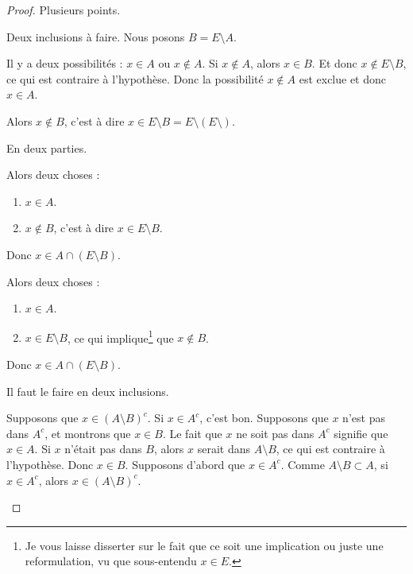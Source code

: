 \begin{proof}
	Plusieurs points.
	\begin{subproof}
		Deux inclusions à faire. Nous posons \( B=E\setminus A\).
		\begin{subproof}
			Il y a deux possibilités : \( x\in A\) ou \( x\not\in A\). Si \( x\not\in A\), alors \( x\in B\). Et donc \( x\not\in E\setminus B\), ce qui est contraire à l'hypothèse. Donc la possibilité \( x\not\in A\) est exclue et donc \( x\in A\).

			\spitem[Si \( x\in A\)]
			Alors \( x\not\in B\), c'est à dire \( x\in E\setminus B=E\setminus(E\setminus )\).
		\end{subproof}
		En deux parties.
		\begin{subproof}
			\spitem[Si \( x\in A\setminus B\)]
			Alors deux choses :
			\begin{enumerate}
				\item
				      \( x\in A\).
				\item
				      \( x\not\in B\), c'est à dire \( x\in E\setminus B\).
			\end{enumerate}
			Donc \( x\in A\cap(E\setminus B)\).

			\spitem[Si \( x\in A\cap(E\setminus B)\)]
			Alors deux choses :
			\begin{enumerate}
				\item
				      \( x\in A\).
				\item
				      \( x\in E\setminus B\), ce qui implique\footnote{Je vous laisse disserter sur le fait que ce soit une implication ou juste une reformulation, vu que sous-entendu \( x\in E\).} que \( x\not\in B\).
			\end{enumerate}
			Donc \( x\in A\cap (E\setminus B)\).
		\end{subproof}
		Il faut le faire en deux inclusions.
		\begin{subproof}
			Supposons que \( x\in(A\setminus B)^c\). Si \( x\in A^c\), c'est bon. Supposons que \( x\) n'est pas dans \( A^c\), et montrons que \( x\in B\). Le fait que \( x\) ne soit pas dans \( A^c\) signifie que \( x\in A\). Si \( x\) n'était pas dans \( B\), alors \( x\) serait dans \( A\setminus B\), ce qui est contraire à l'hypothèse. Donc \( x\in B\).
			Supposons d'abord que \( x\in A^c\). Comme \( A\setminus B\subset A\), si \( x\in A^c\), alors \( x\in (A\setminus B)^c\).


\end{subproof}
\end{subproof}
\end{proof}
